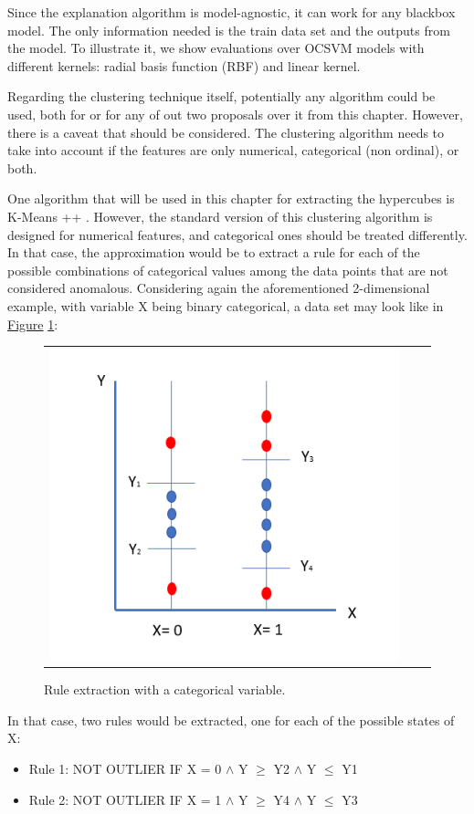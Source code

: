 Since the explanation algorithm is model-agnostic, it can work for any blackbox model. The only information needed is the train data set and the outputs from the model.  To illustrate it, we show evaluations over OCSVM models with different kernels: radial basis function (RBF) and linear kernel.

Regarding the clustering technique itself, potentially any algorithm could be used, both for \parencite{nunez2002rule} or for any of out two proposals over it from this chapter. However, there is a caveat that should be considered. The clustering algorithm needs to take into account if the features are only numerical, categorical (non ordinal), or both. 

One algorithm that will be used in this chapter for extracting the hypercubes is K-Means ++ \parencite{arthur2006k}. However, the standard version of this clustering algorithm is designed for numerical features, and categorical ones should be treated differently. In that case, the approximation would be to extract a rule for each of the possible combinations of categorical values among the data points that are not considered anomalous. Considering again the aforementioned 2-dimensional example, with variable X being binary categorical, a data set may look like in \hyperref[fig:ch4-outlier5]{Figure} \ref{fig:ch4-outlier5}:

\begin{figure}[h!]
\centering
  \begin{tabular}{c@{\qquad}c@{\qquad}c}
\includegraphics[width=0.50\columnwidth]{figures/chapter4_RuleExtraction/outlier_05.png}
  \end{tabular} 
  \caption{Rule extraction with a categorical variable.\label{fig:ch4-outlier5}}
\end{figure}

In that case, two rules would be extracted, one for each of the possible states of X:
\begin{itemize}
    \item Rule 1: NOT OUTLIER IF X = 0 $\land$ Y $\geq$ Y2 $\land$ Y $\leq$ Y1
    \item Rule 2: NOT OUTLIER IF X = 1 $\land$ Y $\geq$ Y4 $\land$ Y $\leq$ Y3
\end{itemize}

